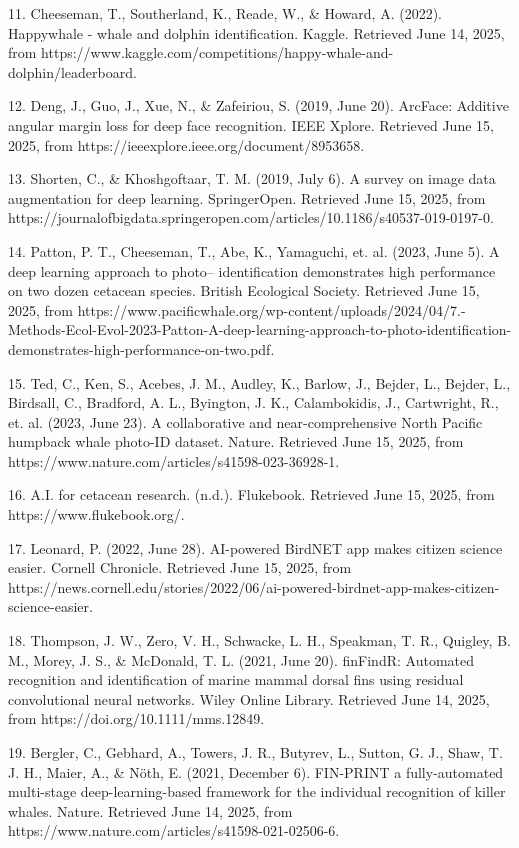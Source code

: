 \documentclass[twocolumn]{article}
\begin{document}
11. Cheeseman, T., Southerland, K., Reade, W., & Howard, A. (2022). Happywhale - whale and dolphin identification. Kaggle. Retrieved June 14, 2025, from https://www.kaggle.com/competitions/happy-whale-and-dolphin/leaderboard.

12. Deng, J., Guo, J., Xue, N., & Zafeiriou, S. (2019, June 20). ArcFace: Additive angular margin loss for deep face recognition. IEEE Xplore. Retrieved June 15, 2025, from https://ieeexplore.ieee.org/document/8953658.

13. Shorten, C., & Khoshgoftaar, T. M. (2019, July 6). A survey on image data augmentation for deep learning. SpringerOpen. Retrieved June 15, 2025, from https://journalofbigdata.springeropen.com/articles/10.1186/s40537-019-0197-0.

14. Patton, P. T., Cheeseman, T., Abe, K., Yamaguchi, et. al. (2023, June 5). A deep learning approach to photo– identification demonstrates high performance on two dozen cetacean species. British Ecological Society. Retrieved June 15, 2025, from https://www.pacificwhale.org/wp-content/uploads/2024/04/7.-Methods-Ecol-Evol-2023-Patton-A-deep-learning-approach-to-photo-identification-demonstrates-high-performance-on-two.pdf.

15. Ted, C., Ken, S., Acebes, J. M., Audley, K., Barlow, J., Bejder, L., Bejder, L., Birdsall, C., Bradford, A. L., Byington, J. K., Calambokidis, J., Cartwright, R., et. al. (2023, June 23). A collaborative and near-comprehensive North Pacific humpback whale photo-ID dataset. Nature. Retrieved June 15, 2025, from https://www.nature.com/articles/s41598-023-36928-1.

16. A.I. for cetacean research. (n.d.). Flukebook. Retrieved June 15, 2025, from https://www.flukebook.org/.

17. Leonard, P. (2022, June 28). AI-powered BirdNET app makes citizen science easier. Cornell Chronicle. Retrieved June 15, 2025, from https://news.cornell.edu/stories/2022/06/ai-powered-birdnet-app-makes-citizen-science-easier.

18. Thompson, J. W., Zero, V. H., Schwacke, L. H., Speakman, T. R., Quigley, B. M., Morey, J. S., & McDonald, T. L. (2021, June 20). finFindR: Automated recognition and identification of marine mammal dorsal fins using residual convolutional neural networks. Wiley Online Library. Retrieved June 14, 2025, from https://doi.org/10.1111/mms.12849.

19. Bergler, C., Gebhard, A., Towers, J. R., Butyrev, L., Sutton, G. J., Shaw, T. J. H., Maier, A., & Nöth, E. (2021, December 6). FIN-PRINT a fully-automated multi-stage deep-learning-based framework for the individual recognition of killer whales. Nature. Retrieved June 14, 2025, from https://www.nature.com/articles/s41598-021-02506-6.
\end{document}
